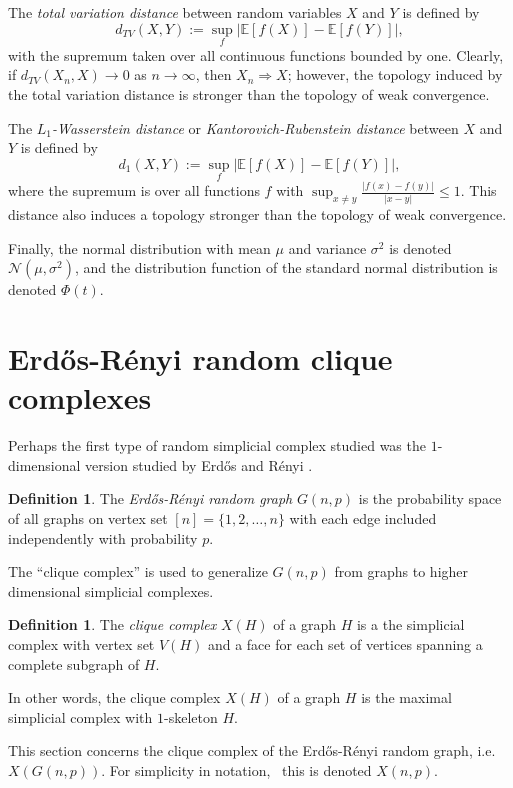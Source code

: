 \documentclass{amsart}
\theoremstyle{definition}
\newtheorem{definition}[thm]{Definition}
\newcommand{\E}{\mathbb{E}}
\renewcommand{\1}{\mathbb{1}}
\begin{document}
The {\it total variation distance} between random variables $X$ and $Y$ 
is defined by 
$$d_{TV}(X,Y):=\sup_f\big|\E[f(X)]-\E[f(Y)]\big|,$$
with the supremum taken over all continuous functions bounded by one.  Clearly,
if $d_{TV}(X_n,X)\to0$ as $n\to\infty$, then $X_n\Rightarrow X$; however, the 
topology induced by the total variation distance is stronger than the 
topology of weak convergence.

The {\it $L_1$-Wasserstein distance} or {\it Kantorovich-Rubenstein distance}
between $X$ and $Y$ is defined by 
$$d_1(X,Y):=\sup_f\big|\E[f(X)]-\E[f(Y)]\big|,$$
where the supremum is over all functions $f$ with $\sup_{x\neq y}\frac{|f(x)-f(y)|}{
|x-y|}\le 1.$  This distance also induces a topology stronger than the topology
of weak convergence.



Finally, the normal distribution with mean $\mu$ and variance $\sigma^2$ is
denoted $\mathcal{N}(\mu,\sigma^2)$, and the distribution function of the 
standard normal distribution is denoted $\Phi(t)$.
 

\section{Erd\H{o}s-R\'enyi random clique complexes}

Perhaps the first type of random simplicial complex studied was the
$1$-dimensional version studied by Erd\H{o}s and R\'enyi \cite{Erd1}.

\begin{definition} 
The {\it Erd\H{o}s-R\'enyi random graph} $G(n,p)$ is the probability
space of all graphs on vertex set $[n] = \{1, 2, \dots, n \}$ with
each edge included independently with probability 
$p$.
\end{definition}

The ``clique complex'' is used  to generalize $G(n,p)$ from graphs to
higher dimensional simplicial complexes.

\begin{definition} 
The {\it clique complex} $X(H)$ of a graph $H$ is a the simplicial
complex with vertex set $V(H)$ and a face for 
each set of vertices spanning a
complete subgraph of $H$.
\end{definition}

In other words, the clique complex $X(H)$ of a graph $H$ is the 
maximal simplicial complex with $1$-skeleton $H$.

This section concerns the clique complex of the Erd\H{o}s-R\'enyi  random
graph, i.e.\ $X(G(n,p))$.  For simplicity in notation, \
this is denoted $X(n,p)$.
\end{document}
